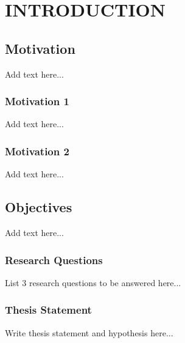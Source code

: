 \chapter{INTRODUCTION} \label{intro}


\section{Motivation}
Add text here...

\subsection{Motivation 1}
Add text here...

\subsection{Motivation 2}
Add text here...

\section{Objectives}
Add text here...

\subsection{Research Questions}
List 3 research questions to be answered here...

\subsection{Thesis Statement}
Write thesis statement and hypothesis here...
